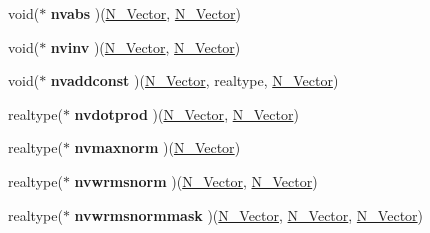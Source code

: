 \begin{DoxyCompactItemize}
void($\ast$ {\bfseries nvabs} )(\mbox{\hyperlink{struct__generic__N__Vector}{N\+\_\+\+Vector}}, \mbox{\hyperlink{struct__generic__N__Vector}{N\+\_\+\+Vector}})
\item 
\mbox{\label{struct__generic__N__Vector__Ops_afdb28d94aff0812f09e2e0febed9cf8c}} 
void($\ast$ {\bfseries nvinv} )(\mbox{\hyperlink{struct__generic__N__Vector}{N\+\_\+\+Vector}}, \mbox{\hyperlink{struct__generic__N__Vector}{N\+\_\+\+Vector}})
\item 
\mbox{\label{struct__generic__N__Vector__Ops_a558d330c2bc3a1c9bcffceff8eb0e60d}} 
void($\ast$ {\bfseries nvaddconst} )(\mbox{\hyperlink{struct__generic__N__Vector}{N\+\_\+\+Vector}}, realtype, \mbox{\hyperlink{struct__generic__N__Vector}{N\+\_\+\+Vector}})
\item 
\mbox{\label{struct__generic__N__Vector__Ops_a906fa394cac0d52a55684f373be76e2f}} 
realtype($\ast$ {\bfseries nvdotprod} )(\mbox{\hyperlink{struct__generic__N__Vector}{N\+\_\+\+Vector}}, \mbox{\hyperlink{struct__generic__N__Vector}{N\+\_\+\+Vector}})
\item 
\mbox{\label{struct__generic__N__Vector__Ops_a03ee028d28ba27e7f0b21a4d417e0e98}} 
realtype($\ast$ {\bfseries nvmaxnorm} )(\mbox{\hyperlink{struct__generic__N__Vector}{N\+\_\+\+Vector}})
\item 
\mbox{\label{struct__generic__N__Vector__Ops_a8702451b41d5aae8edd35d4bec11753a}} 
realtype($\ast$ {\bfseries nvwrmsnorm} )(\mbox{\hyperlink{struct__generic__N__Vector}{N\+\_\+\+Vector}}, \mbox{\hyperlink{struct__generic__N__Vector}{N\+\_\+\+Vector}})
\item 
\mbox{\label{struct__generic__N__Vector__Ops_a2a64dd3c8644a86da3d906fd31b893f3}} 
realtype($\ast$ {\bfseries nvwrmsnormmask} )(\mbox{\hyperlink{struct__generic__N__Vector}{N\+\_\+\+Vector}}, \mbox{\hyperlink{struct__generic__N__Vector}{N\+\_\+\+Vector}}, \mbox{\hyperlink{struct__generic__N__Vector}{N\+\_\+\+Vector}})
\item 
\mbox{\label{struct__generic__N__Vector__Ops_a6e52fb634c8db78b7b0c701e39a6a704}} 

\end{DoxyCompactItemize}
